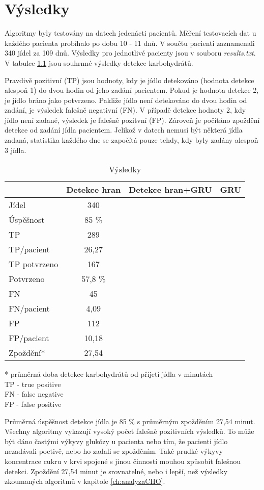 \chapter{Výsledky}

Algoritmy byly testovány na datech jedenácti pacientů. Měření testovacích dat u každého pacienta probíhalo po dobu 10 - 11 dnů. V součtu pacienti zaznamenali 340 jídel za 109 dnů. Výsledky pro jednotlivé pacienty jsou v souboru \textit{results.txt}. V tabulce \ref{tab:results} jsou souhrnné výsledky detekce karbohydrátů.

Pravdivě pozitivní (TP) jsou hodnoty, kdy je jídlo detekováno (hodnota detekce alespoň 1) do dvou hodin od jeho zadání pacientem. Pokud je hodnota detekce 2, je jídlo bráno jako potvrzeno. Pakliže jídlo není detekováno do dvou hodin od zadání, je výsledek falešně negativní (FN). V případě detekce hodnoty 2, kdy jídlo není zadané, výsledek je falešně pozitvní (FP). Zároveň je počítáno zpoždění detekce od zadání jídla pacientem. Jelikož v datech nemusí být některá jídla zadaná, statistika každého dne se započítá pouze tehdy, kdy byly zadány alespoň 3 jídla.

\begin{table}[H]
\caption{Výsledky}
\label{tab:results}
\begin{tabular}{|l|c|c|c|}
\hline 
& \textbf{Detekce hran} & \textbf{Detekce hran+GRU} & \textbf{ GRU }\\
\hline 
\hline 
Jídel & 340 &  &  \\\hline
Úspěšnost & 85 \% &  &  \\\hline
TP & 289 &  &  \\\hline
TP/pacient & 26,27 &  &  \\\hline
TP potvrzeno & 167 &  &  \\\hline
Potvrzeno & 57,8 \% &  &  \\\hline
FN & 45 &  &  \\\hline
FN/pacient & 4,09 &  &  \\\hline
FP & 112 &  &  \\\hline
FP/pacient & 10,18 &  &  \\\hline
Zpoždění* & 27,54 &  &  \\
\hline
\end{tabular}
\begin{flushleft}
* průměrná doba detekce karbohydrátů od příjetí jídla v minutách\\
TP - true positive\\
FN - false negative\\
FP - false positive\\
\end{flushleft}
\end{table}

Průměrná úspěšnost detekce jídla je 85 \% s průměrným zpožděním 27,54 minut. Všechny algoritmy vykazují vysoký počet falešně pozitivních výsledků. To může být dáno častými výkyvy glukózy u pacienta nebo tím, že pacienti jídlo nezadávali poctivě, nebo ho zadali se zpožděním. Také prudké výkyvy koncentrace cukru v krvi spojené s jinou činností mouhou způsobit falešnou detekci. Zpoždění 27,54 minut je srovnatelné, nebo i lepší, než výsledky zkoumaných algoritmů v kapitole \ref{ch:analyzaCHO}.